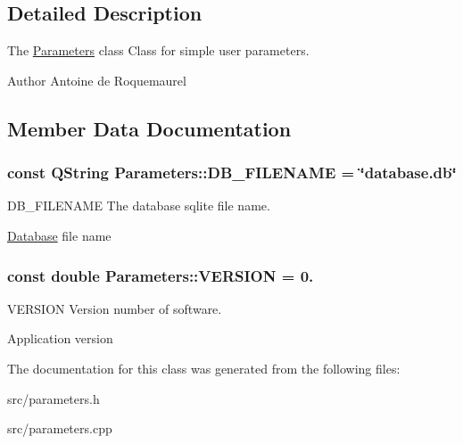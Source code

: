 \subsection{Detailed Description}
The \hyperlink{classParameters}{Parameters} class Class for simple user parameters. 

\begin{DoxyAuthor}{Author}
Antoine de Roquemaurel 
\end{DoxyAuthor}


\subsection{Member Data Documentation}
\hypertarget{classParameters_a80b98bd51d910bcc2203afcacbc7df87}{
\subsubsection[{D\+B\+\_\+\+F\+I\+L\+E\+N\+A\+M\+E}]{\setlength{\rightskip}{0pt plus 5cm}const Q\+String Parameters\+::\+D\+B\+\_\+\+F\+I\+L\+E\+N\+A\+M\+E = \char`\"{}database.\+db\char`\"{}\hspace{0.3cm}{\ttfamily [static]}}}\label{classParameters_a80b98bd51d910bcc2203afcacbc7df87}


D\+B\+\_\+\+F\+I\+L\+E\+N\+A\+M\+E The database sqlite file name. 

\hyperlink{namespaceDatabase}{Database} file name \hypertarget{classParameters_a279ee24140c761de46178daa8960bdc8}{
\subsubsection[{V\+E\+R\+S\+I\+O\+N}]{\setlength{\rightskip}{0pt plus 5cm}const double Parameters\+::\+V\+E\+R\+S\+I\+O\+N = 0.\hspace{0.3cm}{\ttfamily [static]}}}\label{classParameters_a279ee24140c761de46178daa8960bdc8}


V\+E\+R\+S\+I\+O\+N Version number of software. 

Application version 

The documentation for this class was generated from the following files\+:\begin{DoxyCompactItemize}
\item 
src/parameters.\+h\item 
src/parameters.\+cpp\end{DoxyCompactItemize}
